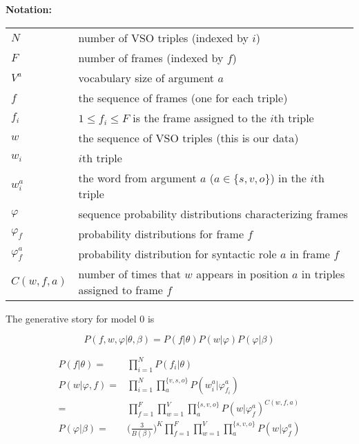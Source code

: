 \documentclass{article}
\renewcommand\phi\varphi
\begin{document}
\textbf{Notation:}
\begin{table}[h]
\begin{tabular}{ll}
$N$                   & number of VSO triples (indexed by $i$)                      \\
$F$                   & number of frames (indexed by $f$)                       \\
$V^a$                 & vocabulary size of argument $a$\\
$f$                   & the sequence of frames (one for each triple)        \\
$f_i$                 & $1\leq f_i\leq F$ is the frame assigned to the $i$th triple      \\
$w$           & the sequence of VSO triples (this is our data)                               \\
$ w_i$            & $i$th triple                                            \\
$w_i^{a}$           & the word from argument $a$ ($a\in\{s,v,o\}$) in the $i$th triple \\
$\phi$          & sequence probability distributions characterizing frames    \\
$\phi_f$          & probability distributions for frame $f$                  \\
$\phi_f^{a}$        & probability distribution for syntactic role $a$ in frame $f$ \\
$C(w,f,a)$          & number of times that $w$ appears in position $a$ in triples assigned to frame $f$\\
\end{tabular}
\end{table}

The generative story for model 0 is



\[
P(f,w,\phi|\theta,\beta)
= P(f|\theta)P(w|\phi)P(\phi|\beta)
\]

\begin{align*}
P(f|\theta)      =& \prod_{i=1}^{N}P(f_i|\theta)\\
P(w|\phi,f)      =& \prod_{i=1}^N\prod_{a}^{\{v,s,o\}}P(w_i^a | \phi_{f_i}^a)\\
                 =& \prod_{f=1}^{F}\prod_{w=1}^{V}\prod_{a}^{\{s,v,o\}}P(w|\phi_f^a)^{C(w,f,a)}\\
P(\phi|\beta)    =& \Big(\frac{3}{B(\beta)}\Big)^K\prod_{f=1}^{F}\prod_{w=1}^{V}\prod_{a}^{\{s,v,o\}}P(w|\phi_f^a)
\end{align*}
\end{document}
